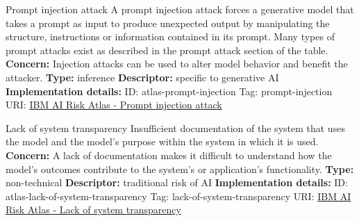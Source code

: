 \documentclass[a4paper,12pt]{article}
\begin{document}
\begin{definitionbox}{Prompt injection attack}
A prompt injection attack forces a generative model that takes a prompt as input to produce unexpected output by manipulating the structure, instructions or information contained in its prompt. Many types of prompt attacks exist as described in the prompt attack section of the table.\newline\newline
\textbf{Concern: }Injection attacks can be used to alter model behavior and benefit the attacker.\newline\newline
\textbf{Type: }inference\newline
\textbf{Descriptor: }specific to generative AI \newline\newline
\textbf{Implementation details: } \newline
ID: atlas-prompt-injection \newline
Tag: prompt-injection \newline
URI:  \href{https://www.ibm.com/docs/en/watsonx/saas?topic=SSYOK8/wsj/ai-risk-atlas/prompt-injection.html}{IBM AI Risk Atlas - Prompt injection attack}\newline
\end{definitionbox}
\begin{definitionbox}{Lack of system transparency}
Insufficient documentation of the system that uses the model and the model's purpose within the system in which it is used.\newline\newline
\textbf{Concern: }A lack of documentation makes it difficult to understand how the model's outcomes contribute to the system's or application's functionality.\newline\newline
\textbf{Type: }non-technical\newline
\textbf{Descriptor: }traditional risk of AI \newline\newline
\textbf{Implementation details: } \newline
ID: atlas-lack-of-system-transparency \newline
Tag: lack-of-system-transparency \newline
URI:  \href{https://www.ibm.com/docs/en/watsonx/saas?topic=SSYOK8/wsj/ai-risk-atlas/lack-of-system-transparency.html}{IBM AI Risk Atlas - Lack of system transparency}\newline
\end{definitionbox}
\end{document}
